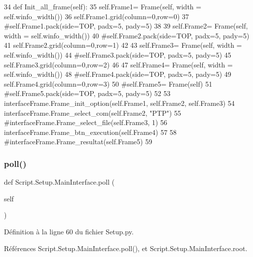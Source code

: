 \begin{DoxyCode}
34     \textcolor{keyword}{def }Init\_all\_frame(self):
35         self.Frame1= Frame(self, width = self.winfo\_width())
36         self.Frame1.grid(column=0,row=0)
37         \textcolor{comment}{#self.Frame1.pack(side=TOP, padx=5, pady=5)
}
38 
39         self.Frame2= Frame(self, width = self.winfo\_width())
40         \textcolor{comment}{#self.Frame2.pack(side=TOP, padx=5, pady=5)
}
41         self.Frame2.grid(column=0,row=1)
42         
43         self.Frame3= Frame(self, width = self.winfo\_width())
44         \textcolor{comment}{#self.Frame3.pack(side=TOP, padx=5, pady=5)
}
45         self.Frame3.grid(column=0,row=2)
46         
47         self.Frame4= Frame(self, width = self.winfo\_width())
48         \textcolor{comment}{#self.Frame4.pack(side=TOP, padx=5, pady=5)
}
49         self.Frame4.grid(column=0,row=3)
50         \textcolor{comment}{#self.Frame5= Frame(self)
}
51         \textcolor{comment}{#self.Frame5.pack(side=TOP, padx=5, pady=5)
}
52 
53         interfaceFrame.Frame\_init\_option(self.Frame1, self.Frame2, self.Frame3)
54         interfaceFrame.Frame\_select\_com(self.Frame2, \textcolor{stringliteral}{"PTP"})
55         \textcolor{comment}{#interfaceFrame.Frame\_select\_file(self.Frame3, 1)
}
56         interfaceFrame.Frame\_btn\_execution(self.Frame4)
57 
58         \textcolor{comment}{#interfaceFrame.Frame\_resultat(self.Frame5)
}
59 
\end{DoxyCode}
\mbox{\label{classScript_1_1Setup_1_1MainInterface_a92190b04a1cf9aa5497439f2dd6dcd99}} 
\subsubsection{\texorpdfstring{poll()}{poll()}}
{\footnotesize\ttfamily def Script.\+Setup.\+Main\+Interface.\+poll (\begin{DoxyParamCaption}\item[{}]{self }\end{DoxyParamCaption})}



Définition à la ligne 60 du fichier Setup.\+py.



Références Script.\+Setup.\+Main\+Interface.\+poll(), et Script.\+Setup.\+Main\+Interface.\+root.



